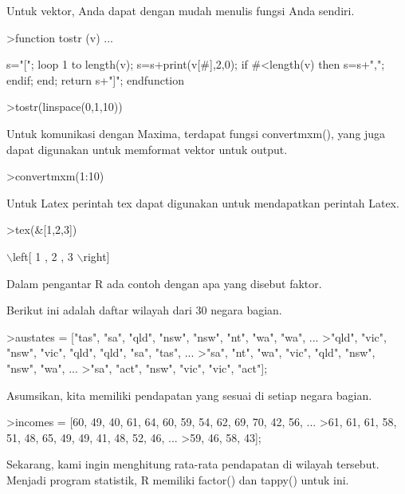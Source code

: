 \documentclass{article}
\begin{document}
\begin{eulernotebook}
\begin{eulercomment}
\begin{eulercomment}
\begin{eulercomment}
Untuk vektor, Anda dapat dengan mudah menulis fungsi Anda sendiri.
\end{eulercomment}
\begin{eulerprompt}
>function tostr (v) ...
\end{eulerprompt}
\begin{eulerudf}
  s="[";
  loop 1 to length(v);
     s=s+print(v[#],2,0);
     if #<length(v) then s=s+","; endif;
  end;
  return s+"]";
  endfunction
\end{eulerudf}
\begin{eulerprompt}
>tostr(linspace(0,1,10))
\end{eulerprompt}
\begin{euleroutput}
  [0.00,0.10,0.20,0.30,0.40,0.50,0.60,0.70,0.80,0.90,1.00]
\end{euleroutput}
\begin{eulercomment}
Untuk komunikasi dengan Maxima, terdapat fungsi convertmxm(), yang
juga dapat digunakan untuk memformat vektor untuk output.
\end{eulercomment}
\begin{eulerprompt}
>convertmxm(1:10)
\end{eulerprompt}
\begin{euleroutput}
  [1,2,3,4,5,6,7,8,9,10]
\end{euleroutput}
\begin{eulercomment}
Untuk Latex perintah tex dapat digunakan untuk mendapatkan perintah
Latex.
\end{eulercomment}
\begin{eulerprompt}
>tex(&[1,2,3])
\end{eulerprompt}
\begin{euleroutput}
  \(\backslash\)left[ 1 , 2 , 3 \(\backslash\)right] 
\end{euleroutput}
\begin{eulercomment}
Dalam pengantar R ada contoh dengan apa yang disebut faktor.

Berikut ini adalah daftar wilayah dari 30 negara bagian.
\end{eulercomment}
\begin{eulerprompt}
>austates = ["tas", "sa", "qld", "nsw", "nsw", "nt", "wa", "wa", ...
>"qld", "vic", "nsw", "vic", "qld", "qld", "sa", "tas", ...
>"sa", "nt", "wa", "vic", "qld", "nsw", "nsw", "wa", ...
>"sa", "act", "nsw", "vic", "vic", "act"];
\end{eulerprompt}
\begin{eulercomment}
Asumsikan, kita memiliki pendapatan yang sesuai di setiap negara
bagian.
\end{eulercomment}
\begin{eulerprompt}
>incomes = [60, 49, 40, 61, 64, 60, 59, 54, 62, 69, 70, 42, 56, ...
>61, 61, 61, 58, 51, 48, 65, 49, 49, 41, 48, 52, 46, ...
>59, 46, 58, 43];
\end{eulerprompt}
\begin{eulercomment}
Sekarang, kami ingin menghitung rata-rata pendapatan di wilayah
tersebut. Menjadi program statistik, R memiliki factor() dan tappy()
untuk ini.


\end{eulercomment}
\end{eulercomment}
\end{eulercomment}
\end{eulernotebook}
\end{document}
